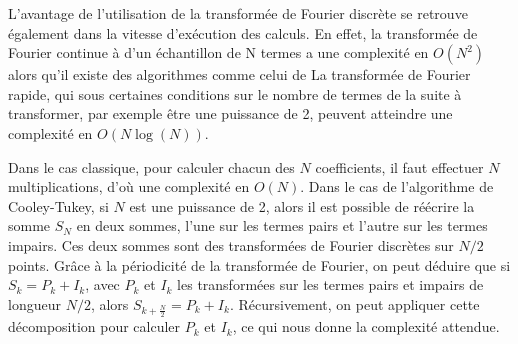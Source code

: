\documentclass[]{article}
\theoremstyle{remark}
\theoremstyle{definition}
\begin{document}
	L'avantage de l'utilisation de la transformée de Fourier discrète se retrouve également dans la vitesse d'exécution des calculs. En effet, la transformée de Fourier continue à d'un échantillon de N termes a une complexité en $O(N^2)$ alors qu'il existe des algorithmes comme celui de La transformée de Fourier rapide, qui sous certaines conditions sur le nombre de termes de la suite à transformer, par exemple être une puissance de 2, peuvent atteindre une complexité en $O(N\log(N))$. 
	
	Dans le cas classique, pour calculer chacun des $N$ coefficients, il faut effectuer $N$ multiplications, d'où une complexité en $O(N)$.
	Dans le cas de l'algorithme de Cooley-Tukey, si $N$ est une puissance de 2, alors il est possible de réécrire la somme $S_N$ en deux sommes, l'une sur les termes pairs et l'autre sur les termes impairs. Ces deux sommes sont des transformées de Fourier discrètes sur $N/2$ points. Grâce à la périodicité de la transformée de Fourier, on peut déduire que si $S_k = P_k + I_k$, avec $P_k$ et $I_k$ les transformées sur les termes pairs et impairs de longueur $ N/2$, alors $ S_{k+\frac{N}{2}} = P_k + I_k$.  Récursivement, on peut appliquer cette décomposition pour calculer $P_k$ et $I_k$, ce qui nous donne la complexité attendue. 
	
	
\end{document}

